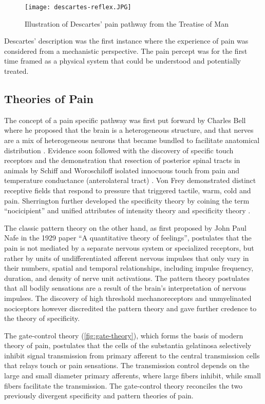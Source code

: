 \begin{figure}[ht]
\texttt{[image: descartes-reflex.JPG]}
\centering
\caption{Illustration of Descartes' pain pathway from the Treatise of Man}
\label{fig:descarte}
\end{figure}

Descartes' description was the first instance where the experience of pain was considered from a mechanistic perspective. The pain percept was for the first time framed as a physical system that could be understood and potentially treated.

\subsection{Theories of Pain}
 
The concept of a pain specific pathway was first put forward by Charles Bell where he proposed that the brain is a heterogeneous structure, and that nerves are a mix of heterogeneous neurons that became bundled to facilitate anatomical distribution \cite{Bell1868}. Evidence soon followed with the discovery of specific touch receptors and the demonstration that resection of posterior spinal tracts in animals by Schiff and Woroschiloff isolated innocuous touch from pain and temperature conductance (anterolateral tract) \cite{Dallenbach1939}. Von Frey demonstrated distinct receptive fields that respond to pressure that triggered tactile, warm, cold and pain. Sherrington further developed the specificity theory by coining the term “nocicipient” and unified attributes of intensity theory and specificity theory \cite{Casey1982}.

The classic pattern theory on the other hand, as first proposed by John Paul Nafe in the 1929 paper “A quantitative theory of feelings”\cite{Nafe1929}, postulates that the pain is not mediated by a separate nervous system or specialized receptors, but rather by units of undifferentiated afferent nervous impulses that only vary in their numbers, spatial and temporal relationships, including impulse frequency, duration, and density of nerve unit activations. The pattern theory postulates that all bodily sensations are a result of the brain's interpretation of nervous impulses. The discovery of high threshold mechanoreceptors and unmyelinated nociceptors however discredited the pattern theory and gave further credence to the theory of specificity. 

The gate-control theory \cite{Melzack1965a} (\ref{fig:gate-theory}), which forms the basis of modern theory of pain, postulates that the cells of the substantia gelatinosa selectively inhibit signal transmission from primary afferent to the central transmission cells that relays touch or pain sensations. The transmission control depends on the large and small diameter primary afferents, where large fibers inhibit, while small fibers facilitate the transmission. The gate-control theory reconciles the two previously divergent specificity and pattern theories of pain.

